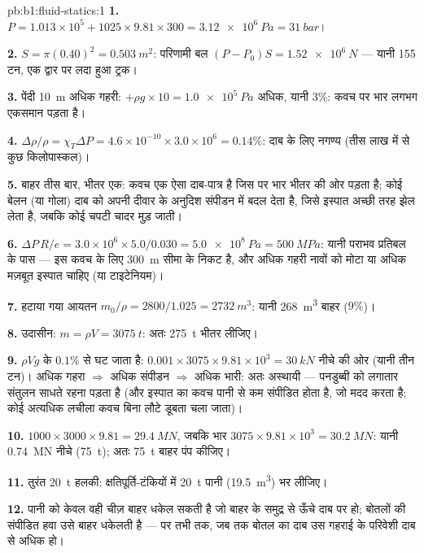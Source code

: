 \begin{solution}{pb:b1:fluid-statics:1}
\textbf{1.} $P = 1.013\times10^5 + 1025 \times 9.81 \times 300 = \qty{3.12e6}{Pa}
= \qty{31}{bar}$।

\textbf{2.} $S = \pi(0.40)^2 = \qty{0.503}{m^2}$: परिणामी बल $(P - P_0)S =
\qty{1.52e6}{N}$ --- यानी 155 टन, एक द्वार पर लदा हुआ ट्रक।

\textbf{3.} पेंदी \qty{10}{m} अधिक गहरी: $+\rho g \times 10 = \qty{1.0e5}{Pa}$ अधिक,
यानी $3\%$: कवच पर भार लगभग एकसमान पड़ता है।

\textbf{4.} $\Delta\rho/\rho = \chi_T\Delta P = 4.6\times10^{-10} \times 3.0\times10^6
= 0.14\%$: दाब के लिए नगण्य (तीस लाख में से कुछ किलोपास्कल)।

\textbf{5.} बाहर तीस बार, भीतर एक: कवच एक ऐसा दाब-पात्र है जिस पर भार भीतर
की ओर पड़ता है; कोई बेलन (या गोला) दाब को अपनी दीवार के अनुदिश संपीडन में
बदल देता है, जिसे इस्पात अच्छी तरह झेल लेता है, जबकि कोई चपटी चादर मुड़
जाती।

\textbf{6.} $\Delta P\,R/e = 3.0\times10^6 \times 5.0/0.030 = \qty{5.0e8}{Pa}
= \qty{500}{MPa}$: यानी पराभव प्रतिबल के पास --- इस कवच के लिए \qty{300}{m}
सीमा के निकट है, और अधिक गहरी नावों को मोटा या अधिक मज़बूत इस्पात चाहिए
(या टाइटेनियम)।

\textbf{7.} हटाया गया आयतन $m_0/\rho = 2800/1.025 = \qty{2732}{m^3}$: यानी \qty{268}{m^3}
बाहर ($9\%$)।

\textbf{8.} उदासीन: $m = \rho V = \qty{3075}{t}$: अतः \qty{275}{t} भीतर लीजिए।

\textbf{9.}  $\rho Vg$ के $0.1\%$ से घट जाता है: $0.001 \times 3075 \times 9.81
\times10^3 = \qty{30}{kN}$ नीचे की ओर (यानी तीन टन)। अधिक गहरा $\Rightarrow$ अधिक
संपीडन $\Rightarrow$ अधिक भारी: अतः अस्थायी --- पनडुब्बी को लगातार संतुलन
साधते रहना पड़ता है (और इस्पात का कवच पानी से कम संपीडित होता है, जो मदद
करता है; कोई अत्यधिक लचीला कवच बिना लौटे डूबता चला जाता)।

\textbf{10.}  $1000 \times 3000 \times 9.81 = \qty{29.4}{MN}$, जबकि
भार $3075 \times 9.81 \times 10^3 = \qty{30.2}{MN}$: यानी \qty{0.74}{MN} नीचे
(\qty{75}{t}); अतः \qty{75}{t} बाहर पंप कीजिए।

\textbf{11.} तुरंत \qty{20}{t} हलकी: क्षतिपूर्ति-टंकियों में \qty{20}{t} पानी
(\qty{19.5}{m^3}) भर लीजिए।

\textbf{12.} पानी को केवल वही चीज़ बाहर धकेल सकती है जो बाहर के समुद्र से
ऊँचे दाब पर हो; बोतलों की संपीडित हवा उसे बाहर धकेलती है --- पर तभी तक, जब
तक बोतल का दाब उस गहराई के परिवेशी दाब से अधिक हो।


\end{solution}
